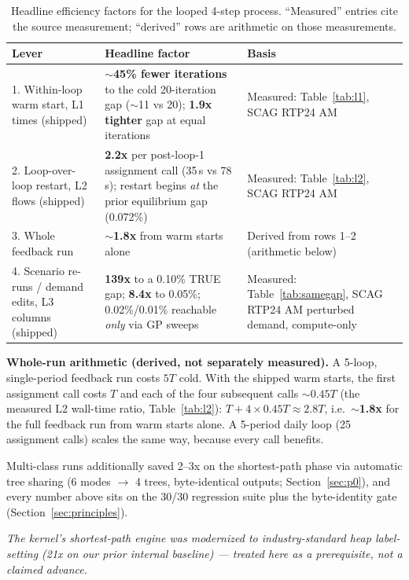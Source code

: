 \documentclass[10pt]{article}
\begin{document}
\begin{table}[h]
\centering
\caption{Headline efficiency factors for the looped 4-step process. ``Measured''
entries cite the source measurement; ``derived'' rows are arithmetic on those
measurements.}
\label{tab:headline}
\small
\begin{tabular}{p{}p{}p{}}
\toprule
Lever & Headline factor & Basis \\
\midrule
1. Within-loop warm start, L1 times (shipped) &
  \textbf{$\sim$45\% fewer iterations} to the cold 20-iteration gap
  ($\sim$11 vs 20); \textbf{1.9x tighter} gap at equal iterations &
  Measured: Table~\ref{tab:l1}, SCAG RTP24 AM \\
2. Loop-over-loop restart, L2 flows (shipped) &
  \textbf{2.2x} per post-loop-1 assignment call (35\,s vs 78\,s); restart
  begins \emph{at} the prior equilibrium gap (0.072\%) &
  Measured: Table~\ref{tab:l2}, SCAG RTP24 AM \\
3. Whole feedback run &
  \textbf{$\sim$1.8x} from warm starts alone &
  Derived from rows 1--2 (arithmetic below) \\
4. Scenario re-runs / demand edits, L3 columns (shipped) &
  \textbf{139x} to a 0.10\% TRUE gap; \textbf{8.4x} to 0.05\%;
  0.02\%/0.01\% reachable \emph{only} via GP sweeps &
  Measured: Table~\ref{tab:samegap}, SCAG RTP24 AM perturbed demand,
  compute-only \\
\bottomrule
\end{tabular}
\end{table}

\textbf{Whole-run arithmetic (derived, not separately measured).} A 5-loop,
single-period feedback run costs $5T$ cold. With the shipped warm starts, the
first assignment call costs $T$ and each of the four subsequent calls
$\sim 0.45T$ (the measured L2 wall-time ratio, Table~\ref{tab:l2}):
$T + 4 \times 0.45T \approx 2.8T$, i.e.\ \textbf{$\sim$1.8x} for the full
feedback run from warm starts alone. A 5-period daily loop (25
assignment calls) scales the same way, because every call benefits.

Multi-class runs additionally saved 2--3x on the shortest-path phase via
automatic tree sharing (6 modes $\rightarrow$ 4 trees, byte-identical outputs;
Section~\ref{sec:p0}), and every number above sits on the 30/30 regression
suite plus the byte-identity gate (Section~\ref{sec:principles}).

{\footnotesize\emph{The kernel's shortest-path engine was modernized to
industry-standard heap label-setting (21x on our prior internal baseline) ---
treated here as a prerequisite, not a claimed advance.}\par}
\end{document}
